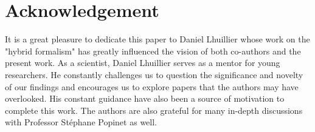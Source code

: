 \documentclass[11pt]{My_preprint}
\begin{document}





% 

% 
% 
% 
% 
% 

% 
% 



% 



\section*{Acknowledgement}
It is a great pleasure to dedicate this paper to Daniel Lhuillier whose work on the "hybrid formalism" has greatly influenced the vision of both co-authors and the present work. 
As a scientist, Daniel Lhuillier serves as a mentor for young researchers. 
He constantly challenges us to question the significance and novelty of our findings and encourages us to explore papers that the authors may have overlooked.
His constant guidance have also been a source of motivation to complete this work.
The authors are also grateful for many in-depth discussions with Professor St\'ephane Popinet as well. 



\appendix






% 
% 
% 
% 


\end{document}
